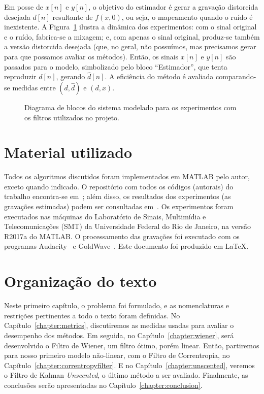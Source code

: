 Em posse de $x[n]$ e $y[n]$, o objetivo do estimador é gerar a gravação distorcida
desejada $d[n]$ resultante de $f(x, 0)$, ou seja, o mapeamento quando o ruído é
inexistente. A Figura~\ref{fig:intro:experiments-model} ilustra a dinâmica dos
experimentos: com o sinal original e o ruído, fabrica-se a mixagem; e, com apenas o
sinal original, produz-se também a versão distorcida desejada (que, no geral, não
possuímos, mas precisamos gerar para que possamos avaliar os métodos). Então, os sinais
$x[n]$ e $y[n]$ são passados para o modelo, simbolizado pelo bloco ``Estimador'', que
tenta reproduzir $d[n]$, gerando $\hat{d}[n]$. A eficiência do método é avaliada
comparando-se medidas entre $(d, \hat{d})$ e $(d, x)$.

\medskip
\begin{figure}[!ht]
	\centering
	
	\caption[Diagrama de blocos do sistema dos experimentos]{Diagrama de blocos do sistema modelado para os experimentos com os filtros utilizados no projeto.}
	\label{fig:intro:experiments-model}
\end{figure}

\section{Material utilizado}

Todos os algoritmos discutidos foram implementados em MATLAB pelo autor, exceto quando
indicado. O repositório com todos os códigos (autorais) do trabalho encontra-se
em~\cite{nonlinear-filters-repo}; além disso, os resultados dos experimentos (as
gravações estimadas) podem ser consultadas em~\cite{nonlinear-results}. Os experimentos
foram executados nas máquinas do Laboratório de Sinais, Multimídia e Telecomunicações
(SMT) da Universidade Federal do Rio
de Janeiro, na versão R2017a do MATLAB. O processamento das gravações foi executado com
os programas Audacity~\cite{audacity} e GoldWave~\cite{goldwave}. Este documento foi
produzido em \LaTeX.

\section{Organização do texto}

Neste primeiro capítulo, o problema foi formulado, e as nomenclaturas e restrições
pertinentes a todo o texto foram definidas. No Capítulo~\ref{chapter:metrics},
discutiremos as medidas usadas para avaliar o desempenho dos métodos. Em seguida, no
Capítulo~\ref{chapter:wiener}, será desenvolvido o Filtro de Wiener, um filtro ótimo,
porém linear. Então, partiremos para nosso primeiro modelo não-linear, com o Filtro de
Correntropia, no Capítulo~\ref{chapter:correntropyfilter}. E no
Capítulo~\ref{chapter:unscented}, veremos o Filtro de Kalman \textit{Unscented}, o
último método a ser avaliado. Finalmente, as conclusões serão apresentadas no
Capítulo~\ref{chapter:conclusion}.
